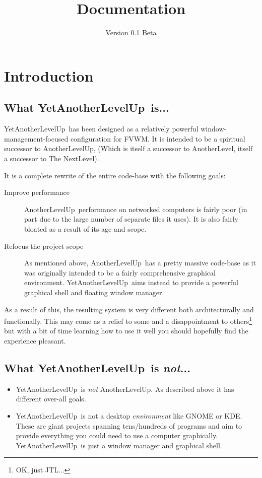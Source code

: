 \documentclass[a4paper,11pt]{article}
\title{\yalu \\ \large{Documentation}}
\date{Version 0.1 Beta}
\newcommand{\yalu}{YetAnotherLevelUp}
\newcommand{\alu}{AnotherLevelUp}
\begin{document}
	\maketitle

	\section{Introduction}
		\subsection{What \yalu\ is...}
			\yalu\ has been designed as a relatively powerful window-management-focused
			configuration for FVWM. It is intended to be a spiritual successor to \alu,
			(Which is itself a successor to AnotherLevel, itself a successor to The
			NextLevel).
			
			It is a complete rewrite of the entire code-base with the following goals:
			\begin{description}
				\item[Improve performance] \alu\ performance on networked computers is
					fairly poor (in part due to the large number of separate files it uses).
					It is also fairly bloated as a result of its age and scope.
				\item[Refocus the project scope] As mentioned above, \alu\ has a pretty massive
					code-base as it was originally intended to be a fairly comprehensive
					graphical environment. \yalu\ aims instead to provide a powerful
					graphical shell and floating window manager.
			\end{description}
			
			As a result of this, the resulting system is very different both
			architecturally and functionally. This may come as a relief to some and a
			disappointment to others\footnote{OK, just JTL...} but with a bit of time
			learning how to use it well you should hopefully find the experience
			pleasant.
		
		\subsection{What \yalu\ is \emph{not}...}
			\begin{itemize}
				\item \yalu\ is \emph{not} \alu. As described above it has different
				over-all goals.
				
				\item \yalu\ is not a desktop \emph{environment} like GNOME or KDE.
				These are giant projects spanning tens/hundreds of programs and aim to
				provide everything you could need to use a computer graphically. \yalu\
				is just a window manager and graphical shell.
			\end{itemize}
		
\end{document}
